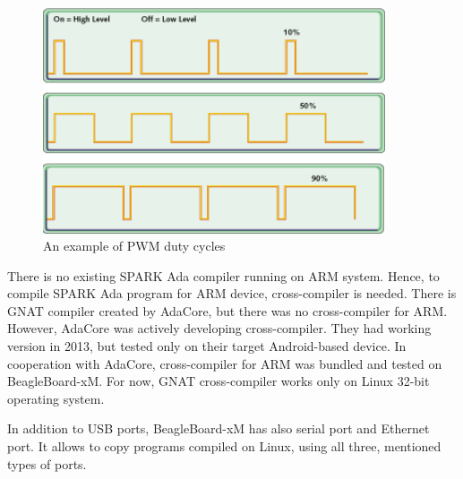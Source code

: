 \begin{figure}[ht]%
    \begin{center}
      \includegraphics[width=0.9\textwidth]{figures/pwm.png}      
    \end{center}
    \caption{An example of PWM duty cycles}
    \label{figure:pwm}
\end{figure}

There is no existing SPARK Ada compiler running on ARM system. Hence, to compile SPARK Ada program for ARM device, cross-compiler is needed. There is GNAT compiler \cite{Horn:Thesis} created by AdaCore, but there was no cross-compiler for ARM. However, AdaCore was actively developing cross-compiler. They had working version in 2013, but tested only on their target Android-based device. In cooperation with AdaCore, cross-compiler for ARM was bundled and tested on BeagleBoard-xM. For now, GNAT cross-compiler works only on Linux 32-bit operating system.

In addition to USB ports, BeagleBoard-xM has also serial port and Ethernet port. It allows to copy programs compiled on Linux, using all three, mentioned types of ports.
